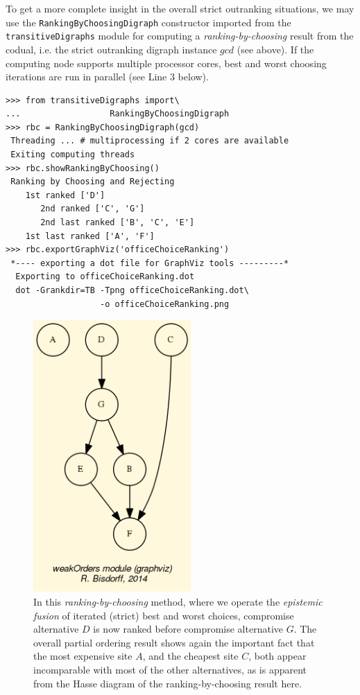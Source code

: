To get a more complete insight in the overall strict outranking situations, we may use the \texttt{RankingByChoosingDigraph} constructor imported from the \texttt{transitiveDigraphs} module for computing a \emph{ranking-by-choosing} result from the codual, i.e. the strict outranking digraph instance $gcd$ (see above). If the computing node supports multiple processor cores, best and worst choosing iterations are run in parallel (see Line 3 below).
\begin{lstlisting}
>>> from transitiveDigraphs import\
...                  RankingByChoosingDigraph
>>> rbc = RankingByChoosingDigraph(gcd)
 Threading ... # multiprocessing if 2 cores are available
 Exiting computing threads
>>> rbc.showRankingByChoosing()
 Ranking by Choosing and Rejecting
    1st ranked ['D']
       2nd ranked ['C', 'G']
       2nd last ranked ['B', 'C', 'E']
    1st last ranked ['A', 'F']
>>> rbc.exportGraphViz('officeChoiceRanking')
 *---- exporting a dot file for GraphViz tools ---------*
  Exporting to officeChoiceRanking.dot
  dot -Grankdir=TB -Tpng officeChoiceRanking.dot\
                   -o officeChoiceRanking.png
\end{lstlisting}
\begin{figure}[h]
\sidecaption
\includegraphics[width=6cm]{Figures/officeChoiceRanking.png}
\caption{In this \emph{ranking-by-choosing} method, where we operate the \emph{epistemic fusion} of iterated (strict) best and worst choices, compromise alternative $D$ is now ranked before compromise alternative $G$. The overall partial ordering result shows again the important fact that the most expensive site $A$, and the cheapest site $C$, both appear incomparable with most of the other alternatives, as is apparent from the Hasse diagram of the ranking-by-choosing result here.} 
\label{fig:6.5}       %
\end{figure}
	   

